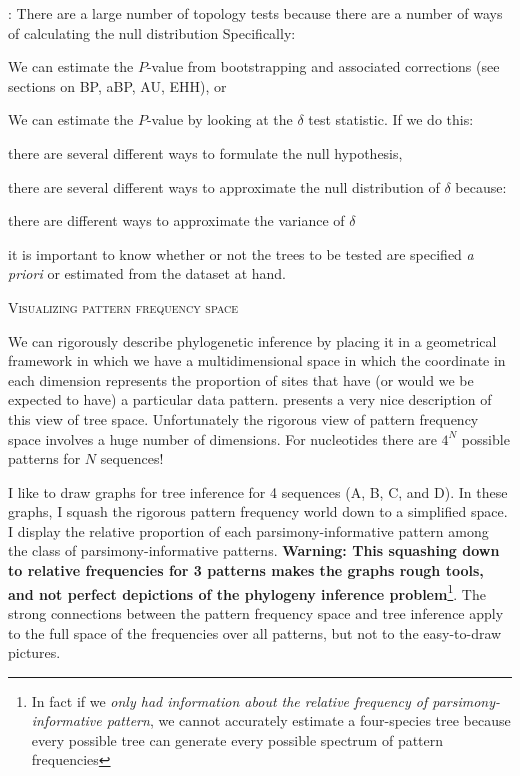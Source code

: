 \documentclass[11pt]{article}
\renewcommand{\section}[2]{%
\bigskip
\begin{center}
\begin{Large}
\normalfont\scshape #2
\medskip
\end{Large}
\end{center}}
\renewcommand{\subsection}[1]{%
\noindent{\large\scshape \underline{#1}}:}
\newcommand{\pvalue}{$P$-value\xspace}
\begin{document}
\subsection{The plethora of topology tests}
There are a large number of topology tests because there are a number of ways of calculating the null distribution
Specifically:
\begin{compactitem}
	\item We can estimate the \pvalue from bootstrapping and associated corrections (see sections on BP, aBP, AU, EHH), or
	\item We can estimate the \pvalue by looking at the $\delta$ test statistic. If we do this:
	\begin{compactitem}
		\item there are several different ways to formulate the null hypothesis,
		\item there are several different ways to approximate the null distribution of $\delta$ because:
		\begin{compactitem}
			\item there are different ways to approximate the variance of $\delta$
			\item it is important to know whether or not the trees to be tested are specified {\em a priori} or estimated from the dataset at hand.
		\end{compactitem}
	\end{compactitem}
\end{compactitem}
\newpage
\section*{Visualizing pattern frequency space}
We can rigorously describe phylogenetic inference by placing it in a geometrical framework in which we have a multidimensional space in which the coordinate in each dimension represents the proportion of sites that have (or would we be expected to have) a particular data pattern.  
\citet{Kim2000} presents a very nice description of this view of tree space.
Unfortunately the rigorous view of pattern frequency space involves a huge number of dimensions.  
For nucleotides there are $4^N$ possible patterns for $N$ sequences!

I like to draw graphs for tree inference for 4 sequences (A, B, C, and D).
In these graphs, I squash the rigorous pattern frequency world down to a simplified space.
I display the relative proportion of each parsimony-informative pattern among the class of parsimony-informative patterns.
{\bf Warning: This squashing down to relative frequencies for 3 patterns makes the graphs rough tools, and not perfect depictions of the phylogeny inference problem}\footnote{In fact if we {\em only had information about the relative frequency of parsimony-informative pattern}, we cannot accurately estimate a four-species tree because every possible tree can generate every possible spectrum of pattern frequencies\citep{AllmanHR2010}}. 
The strong connections between the pattern frequency space and tree inference apply to the full space of the frequencies over all patterns, but not to the easy-to-draw pictures.
\end{document}
